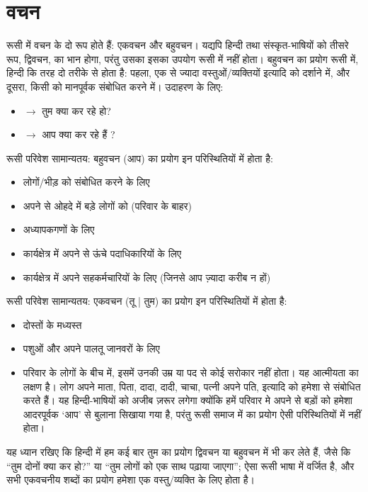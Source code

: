 \section{वचन}\label{sec:intro-plurals}
  रूसी में वचन के दो रूप होते हैं: एकवचन और बहुवचन। यद्यपि हिन्दी तथा संस्कृत-भाषियों को तीसरे रूप, द्विवचन, का भान होगा, परंतु उसका इसका उपयोग रूसी में नहीं होता।
  बहुवचन का प्रयोग रूसी में, हिन्दी कि तरह दो तरीके से होता है: पहला, एक से ज्यादा वस्तुओं/व्यक्तियों इत्यादि को दर्शाने में, और दूसरा, किसी को मानपूर्वक संबोधित करने में।
  उदाहरण के लिए:
  \begin{itemize}
    \item  {} $\rightarrow$ तुम क्या कर रहे हो?
    \item  {} $\rightarrow$ आप क्या कर रहे हैं ?
  \end{itemize}


  रूसी परिवेश सामान्यतय: बहुवचन  (आप) का प्रयोग इन परिस्थितियों में होता है:
  \begin{itemize}
    \item लोगों/भीड़ को संबोधित करने के लिए
    \item अपने से ओहदे में बड़े लोगों को (परिवार के बाहर)
    \item अध्यापकगणों के लिए
    \item कार्यक्षेत्र में अपने से ऊंचे पदाधिकारियों के लिए
    \item कार्यक्षेत्र में अपने सहकर्मचारियों के लिए (जिनसे आप ज़्यादा करीब न हों)
  \end{itemize}

  रूसी परिवेश सामान्यतय: एकवचन  (तू | तुम) का प्रयोग इन परिस्थितियों में होता है:
  \begin{itemize}
    \item दोस्तों के मध्यस्त
    \item पशुओं और अपने पालतू जानवरों के लिए
    \item  परिवार के लोगों के बीच में, इसमें उनकी उम्र या पद से कोई सरोकार नहीं होता। यह आत्मीयता का लक्षण है। लोग अपने माता, पिता,
    दादा, दादी, चाचा, पत्नी अपने पति, इत्यादि को हमेशा  से संबोधित करते हैं। यह हिन्दी-भाषियों को अजीब ज़रूर लगेगा क्योंकि हमें परिवार मे अपने से बड़ों को हमेशा आदरपूर्वक `आप'
    से बुलाना सिखाया गया है, परंतु रूसी समाज में  का प्रयोग ऐसी परिस्थितियों में नहीं होता।
  \end{itemize}
  यह ध्यान रखिए कि हिन्दी में हम कई बार तुम का प्रयोग द्विवचन या बहुवचन में भी कर लेते हैं, जैसे कि ``तुम दोनों क्या कर हो?'' या ``तुम लोगों को एक साथ पढ़ाया जाएगा'';
  ऐसा रूसी भाषा में वर्जित है,  और सभी एकवचनीय शब्दों का प्रयोग हमेशा एक वस्तु/व्यक्ति के लिए होता है।
